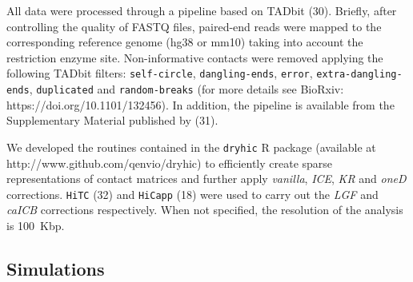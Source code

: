 \documentclass[a4,center,fleqn]{NAR}
\providecommand{\DIFadd}[1]{{\protect\color{red}#1}} %
\providecommand{\DIFdel}[1]{{\protect}}                      %
\providecommand{\DIFaddbegin}{} %
\providecommand{\DIFaddend}{} %
\providecommand{\DIFdelbegin}{} %
\providecommand{\DIFdelend}{} %
\begin{document}

\DIFdelend All data were processed through a pipeline based on TADbit
(\DIFdelbegin \DIFdel{31}\DIFdelend \DIFaddbegin \DIFadd{30}\DIFaddend ). Briefly, after controlling the quality of
FASTQ files, paired-end reads were mapped to the corresponding reference
genome (hg38 \DIFdelbegin \DIFdel{and }\DIFdelend \DIFaddbegin \DIFadd{or }\DIFaddend mm10) taking into account the restriction enzyme site.
Non-informative contacts were removed applying the following TADbit
filters: \texttt{self-circle}, \texttt{dangling-ends}, \texttt{error},
\texttt{extra-dangling-ends}, \texttt{duplicated} and
\texttt{random-breaks} \DIFdelbegin \DIFdel{. For more details , see the methods section of
(27}\DIFdelend \DIFaddbegin \DIFadd{(for more details see BioRxiv:
https://doi.org/10.1101/132456}\DIFaddend ). In addition, the pipeline is available
from the \DIFdelbegin \DIFdel{supplementary material }\DIFdelend \DIFaddbegin \DIFadd{Supplementary Material }\DIFaddend published by (\DIFdelbegin \DIFdel{32}\DIFdelend \DIFaddbegin \DIFadd{31}\DIFaddend ).

We developed the routines contained in the \texttt{dryhic} R package
(available at http://www.github.com/qenvio/dryhic) to efficiently create
sparse representations of contact matrices and further apply
\textit{vanilla}, \textit{ICE}\DIFaddbegin \DIFadd{, }\textit{\DIFadd{KR}} \DIFaddend and \textit{oneD} corrections.
\texttt{HiTC} (\DIFdelbegin \DIFdel{33}\DIFdelend \DIFaddbegin \DIFadd{32}\DIFaddend ) and \texttt{HiCapp}
(18) were used to carry out the \textit{LGF} and
\textit{caICB} corrections respectively. \DIFdelbegin \DIFdel{All the
results are based on a
resolution of
}\DIFdelend \DIFaddbegin \DIFadd{When not specified, the
resolution of the analysis is }\DIFaddend 100\DIFdelbegin \DIFdel{kbp, but we found no major differences at different
resolutions (not shown) }\DIFdelend \DIFaddbegin \DIFadd{~Kbp.
}

\subsection{\DIFadd{Simulations}}
\end{document}
